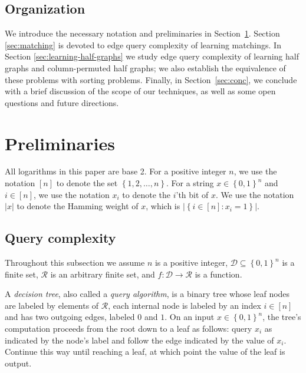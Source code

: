 \documentclass[11pt]{article}
\newcommand{\cD}{\mathcal{D}}
\newcommand{\cR}{\mathcal{R}}
\newcommand{\set}[1]{\left\{ #1 \right\}}
\newcommand{\cbra}[1]{\left\{#1\right\}}
\newcommand{\zone}{\set{0,1}}
\begin{document}
\subsection{Organization}
We introduce the necessary notation and preliminaries in Section~\ref{sec:prelims}. Section \ref{sec:matching} is devoted to edge query complexity of learning matchings. In Section \ref{sec:learning-half-graphs} we study edge query complexity of learning half graphs and column-permuted half graphs; we also establish the equivalence of these problems with sorting problems. Finally, in Section~\ref{sec:conc}, we conclude with a brief discussion of the scope of our techniques, as well as some open questions and future directions.

\section{Preliminaries}\label{sec:prelims}
All logarithms in this paper are base 2. For a positive integer $n$, we use the notation $[n]$ to denote the set $\cbra{1, 2, \dots, n}$. For a string $x \in \zone^n$ and $i \in [n]$, we use the notation $x_i$ to denote the $i$'th bit of $x$. We use the notation $|x|$ to denote the Hamming weight of $x$, which is $|\cbra{i \in [n] : x_i = 1}|$.
 
\subsection{Query complexity}\label{subsec:prelims-query-complexity}


Throughout this subsection we assume $n$ is a positive integer, $\cD \subseteq \zone^n$ is a finite set, $\cR$ is an arbitrary finite set, and $f : \cD \to \cR$ is a function.

A \emph{decision tree}, also called a \emph{query algorithm}, is a binary tree whose leaf nodes are labeled by elements of $\cR$, each internal node is labeled by an index $i \in [n]$ and has two outgoing edges, labeled $0$ and $1$.
On an input $x \in \zone^n$, the tree's computation proceeds from the root down to a leaf as follows: query $x_i$ as indicated by the node's label and follow the edge indicated by the value of $x_i$.
Continue this way until reaching a leaf, at which point the value of the leaf is output.
\end{document}
